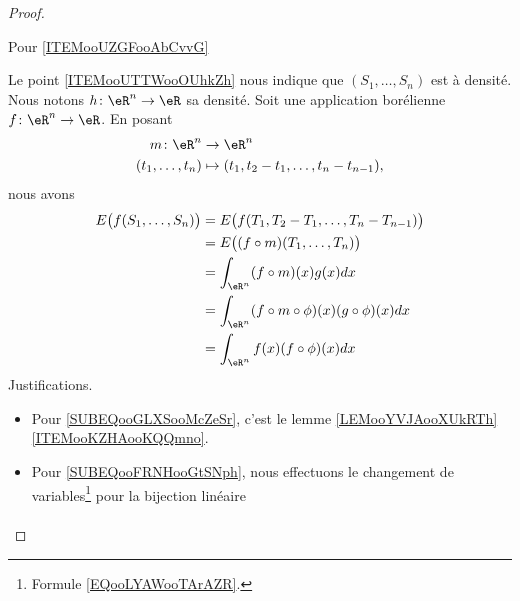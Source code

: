 \begin{proof}
    

    \begin{center}
        Pour \ref{ITEMooUZGFooAbCvvG}
    \end{center}
    \begin{subproof}
         

    Le point \ref{ITEMooUTTWooOUhkZh} nous indique que \( (S_1,\ldots, S_n)\) est à densité. Nous notons \( h\colon \eR^n\to \eR\) sa densité. Soit une application borélienne \( f\colon \eR^n\to \eR\). En posant
    \begin{equation}
        \begin{aligned}
            m\colon \eR^n&\to \eR^n \\
            (t_1,\ldots, t_n)&\mapsto (t_1, t_2-t_1,\ldots, t_n-t_{n-1}),  
        \end{aligned}
    \end{equation}
    nous avons
    \begin{subequations}
        \begin{align}
        E\big( f(S_1,\ldots, S_n) \big)&=E\big( f(T_1,T_2-T_1,\ldots, T_n-T_{n-1}) \big)\\
        &=E\big( (f\circ m)(T_1,\ldots, T_n) \big)\\
        &=\int_{\eR^n}(f\circ m)(x)g(x)dx       \label{SUBEQooGLXSooMcZeSr}\\
        &=\int_{\eR^n}(f\circ m\circ \phi)(x)(g\circ \phi)(x)dx     \label{SUBEQooFRNHooGtSNph}\\
        &=\int_{\eR^n}f(x)(f\circ \phi)(x)dx        \label{SUBEQooETUFooIYIOOO}\\
        \end{align}
    \end{subequations}
    Justifications.
    \begin{itemize}
        \item Pour \eqref{SUBEQooGLXSooMcZeSr}, c'est le lemme \ref{LEMooYVJAooXUkRTh}\ref{ITEMooKZHAooKQQmno}.
        \item Pour \eqref{SUBEQooFRNHooGtSNph}, nous effectuons le changement de variables\footnote{Formule \eqref{EQooLYAWooTArAZR}.} pour la bijection linéaire
            \begin{equation}
                \begin{aligned}

\end{aligned}
\end{equation}
\end{itemize}
\end{subproof}
\end{proof}
